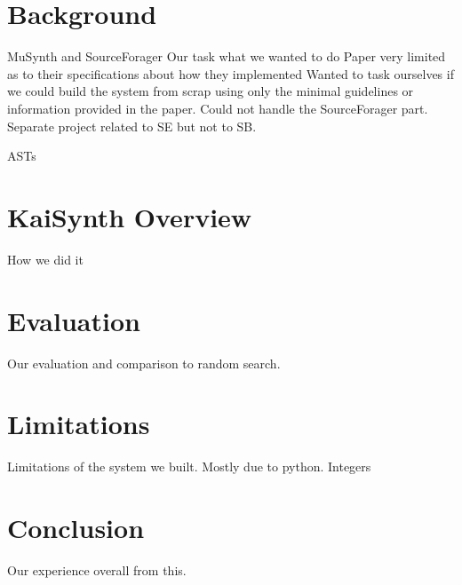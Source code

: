 \documentclass{article}
\begin{document}
\section{Background}
MuSynth \citep{musynth} and SourceForager
Our task what we wanted to do
Paper very limited as to their specifications about how they implemented
Wanted to task ourselves if we could build the system from scrap using only the minimal guidelines or information provided in the paper.
Could not handle the SourceForager part. Separate project related to SE but not to SB.

ASTs


\section{KaiSynth Overview}
How we did it

\section{Evaluation}
Our evaluation and comparison to random search.

\section{Limitations}
Limitations of the system we built. Mostly due to python.
Integers 

\section{Conclusion}
Our experience overall from this.



\end{document}
